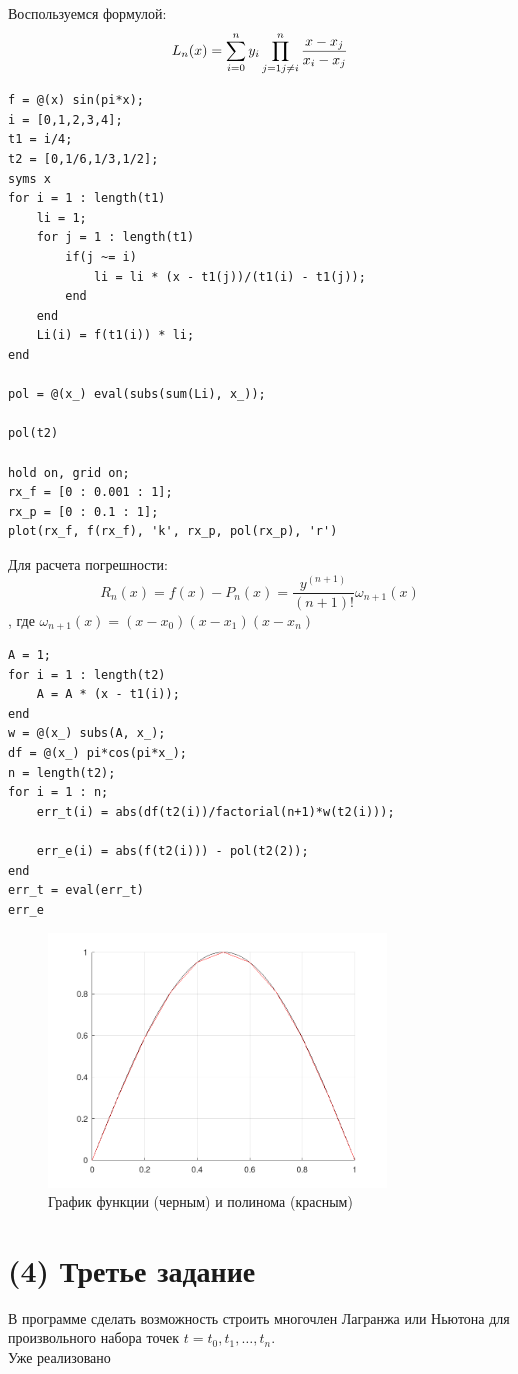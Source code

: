 Воспользуемся формулой:
\[
  L_{n}(x) = \sum_{i=0}^{n}y_{i}\prod_{j=1\\j \neq i}^{n}\frac{x-x_{j}}{x_{i}-x_{j}}
\]
\begin{lstlisting}
f = @(x) sin(pi*x);
i = [0,1,2,3,4];
t1 = i/4;
t2 = [0,1/6,1/3,1/2];
syms x
for i = 1 : length(t1)
	li = 1;
	for j = 1 : length(t1)
		if(j ~= i)
			li = li * (x - t1(j))/(t1(i) - t1(j));
		end
	end
	Li(i) = f(t1(i)) * li;
end

pol = @(x_) eval(subs(sum(Li), x_));

pol(t2)

hold on, grid on;
rx_f = [0 : 0.001 : 1];
rx_p = [0 : 0.1 : 1];
plot(rx_f, f(rx_f), 'k', rx_p, pol(rx_p), 'r')
\end{lstlisting}

Для расчета погрешности:
\[
  R_{n}(x) = f(x)-P_{n}(x) = \frac{y^{(n+1)}}{(n+1)!}\omega_{n+1}(x)
\]
, где $\omega_{n+1}(x) = (x-x_{0})(x-x_{1})(x-x_{n})$
\begin{lstlisting}
A = 1;
for i = 1 : length(t2)
	A = A * (x - t1(i));
end
w = @(x_) subs(A, x_);
df = @(x_) pi*cos(pi*x_);
n = length(t2);
for i = 1 : n;
	err_t(i) = abs(df(t2(i))/factorial(n+1)*w(t2(i)));

	err_e(i) = abs(f(t2(i))) - pol(t2(2));
end
err_t = eval(err_t)
err_e
\end{lstlisting}
\begin{figure}[h]
  \caption{График функции (черным) и полинома (красным)}
  \label{fig:plot_2}
  \centering
  \includegraphics[width=0.8\textwidth]{images/second_task_2.png}
\end{figure}

\section{(4) Третье задание}
В программе сделать возможность строить многочлен Лагранжа или Ньютона для произвольного набора точек $t = t_{0}, t_{1}, \ldots, t_{n}$.\\[2mm]
Уже реализовано

